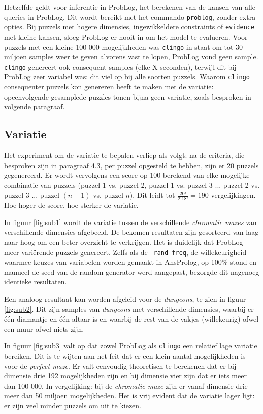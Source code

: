 \documentclass{article}
\begin{document}
Hetzelfde geldt voor inferentie in ProbLog, het berekenen van de kansen van alle queries in ProbLog. Dit wordt bereikt met het commando \texttt{problog}, zonder extra opties. Bij puzzels met hogere dimensies, ingewikkeldere constraints of  \texttt{evidence} met kleine kansen, sloeg ProbLog er nooit in om het model te evalueren. Voor puzzels met een kleine 100 000 mogelijkheden was \texttt{clingo} in staat om tot 30 miljoen samples weer te geven alvorens vast te lopen, ProbLog vond geen sample. \texttt{clingo} genereert ook consequent samples (elke X seconden), terwijl dit bij ProbLog zeer variabel was: dit viel op bij alle soorten puzzels. Waarom \texttt{clingo} consequenter puzzels kon genereren heeft te maken met de variatie: opeenvolgende gesamplede puzzles tonen bijna geen variatie, zoals besproken in volgende paragraaf.
	
	\subsection{Variatie}
	
	Het experiment om de variatie te bepalen verliep als volgt: na de criteria, die besproken zijn in paragraaf 4.3, per puzzel opgesteld te hebben, zijn er 20 puzzels gegenereerd. Er wordt vervolgens een score op 100 berekend van elke mogelijke combinatie van puzzels (puzzel 1 vs. puzzel 2, puzzel 1 vs. puzzel 3 ...  puzzel 2 vs. puzzel 3 ...  puzzel $(n-1)$ vs. puzzel $n$). Dit leidt tot $\frac{20!}{2!18!} = 190$ vergelijkingen. Hoe hoger de score, hoe sterker de variatie.
	
	In figuur \ref{fig:sub1} wordt de variatie tussen de verschillende \textit{chromatic mazes} van verschillende dimensies afgebeeld. De bekomen resultaten zijn gesorteerd van laag naar hoog om een beter overzicht te verkrijgen. Het is duidelijk dat ProbLog meer vari\"erende puzzels genereert. Zelfs als de \texttt{--rand-freq}, de willekeurigheid waarmee keuzes van variabelen worden gemaakt in AnsProlog, op 100\% stond en manueel de seed van de random generator werd aangepast, bezorgde dit nagenoeg identieke resultaten.	
	
	Een analoog resultaat kan worden afgeleid voor de \textit{dungeons}, te zien in figuur \ref{fig:sub2}. Dit zijn samples van \textit{dungeons} met verschillende dimensies, waarbij er \'e\'en diamantje en \'e\'en altaar is  en waarbij de rest van de vakjes (willekeurig) ofwel een muur ofwel niets zijn. 
	
	In figuur \ref{fig:sub3} valt op dat zowel ProbLog als \texttt{clingo} een relatief lage variatie bereiken. Dit is te wijten aan het feit dat er een klein aantal mogelijkheden is voor de \textit{perfect maze}. Er valt eenvoudig theoretisch te berekenen dat er bij dimensie drie 192 mogelijkheden zijn en bij dimensie vier zijn dat er iets meer dan 100 000. In vergelijking: bij de \textit{chromatic maze} zijn er vanaf dimensie drie meer dan 50 miljoen mogelijkheden. Het is vrij evident dat de variatie lager ligt: er zijn veel minder puzzels om uit te kiezen.
	
\end{document}
